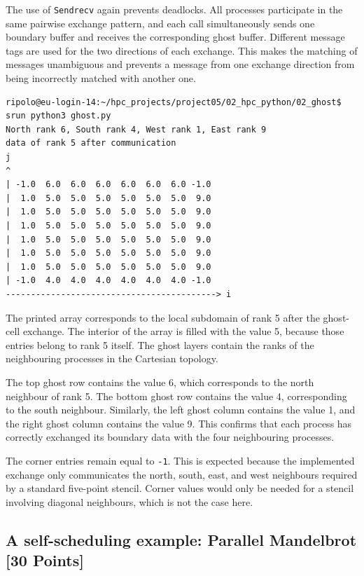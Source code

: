 \documentclass[unicode,10pt,a4paper,oneside,numbers=endperiod,openany]{scrartcl}
\begin{document}
The use of \texttt{Sendrecv} again prevents deadlocks. All processes participate in the same pairwise
exchange pattern, and each call simultaneously sends one boundary buffer and receives the corresponding
ghost buffer. Different message tags are used for the two directions of each exchange. This makes the
matching of messages unambiguous and prevents a message from one exchange direction from being
incorrectly matched with another one.
\begin{lstlisting}[style=grayverbatim,label={lst:ghost_exchange_python_output},caption={Output of the ghost cell exchange between neighboring processes in Python using mpi4py}]
ripolo@eu-login-14:~/hpc_projects/project05/02_hpc_python/02_ghost$ srun python3 ghost.py
North rank 6, South rank 4, West rank 1, East rank 9
data of rank 5 after communication
j
^
| -1.0  6.0  6.0  6.0  6.0  6.0  6.0 -1.0
|  1.0  5.0  5.0  5.0  5.0  5.0  5.0  9.0
|  1.0  5.0  5.0  5.0  5.0  5.0  5.0  9.0
|  1.0  5.0  5.0  5.0  5.0  5.0  5.0  9.0
|  1.0  5.0  5.0  5.0  5.0  5.0  5.0  9.0
|  1.0  5.0  5.0  5.0  5.0  5.0  5.0  9.0
|  1.0  5.0  5.0  5.0  5.0  5.0  5.0  9.0
| -1.0  4.0  4.0  4.0  4.0  4.0  4.0 -1.0
------------------------------------------> i
\end{lstlisting}
The printed array corresponds to the local subdomain of rank 5 after the ghost-cell exchange. The
interior of the array is filled with the value 5, because those entries belong to rank 5 itself. The ghost
layers contain the ranks of the neighbouring processes in the Cartesian topology.

The top ghost row contains the value 6, which corresponds to the north neighbour of rank 5. The bottom
ghost row contains the value 4, corresponding to the south neighbour. Similarly, the left ghost column
contains the value 1, and the right ghost column contains the value 9. This confirms that each process
has correctly exchanged its boundary data with the four neighbouring processes.

The corner entries remain equal to \texttt{-1}. This is expected because the implemented exchange only
communicates the north, south, east, and west neighbours required by a standard five-point stencil.
Corner values would only be needed for a stencil involving diagonal neighbours, which is not the case
here.
\subsection{A self-scheduling example: Parallel Mandelbrot [30 Points]}
\end{document}
